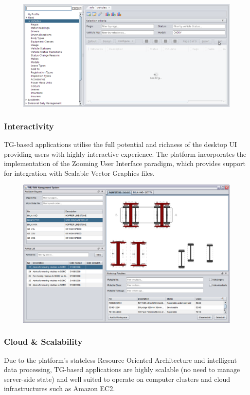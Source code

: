 \documentclass[a4paper,12pt,twocolumn,oneside,openright,final]{memoir}
\begin{document}
  \begin{figure}[!h]
  \centering
  \includegraphics[scale=0.2]{images/03-running.png}
  \end{figure}

\subsubsection*{Interactivity}
  TG-based applications utilise the full potential and richness of the desktop UI providing users with highly interactive experience.
  The platform incorporates the implementation of the Zooming User Interface paradigm, which provides support for integration with Scalable Vector Graphics files.

  \begin{figure}[!h]
  \centering
  \includegraphics[scale=0.18]{images/02-workspace-custom-layout.png}
  \end{figure}

\subsubsection*{Cloud \& Scalability}
  Due to the platform's stateless Resource Oriented Architecture and intelligent data processing, TG-based applications are highly scalable (no need to manage server-side state) and well suited to operate on computer clusters and cloud infrastructures such as Amazon EC2.
\end{document}
